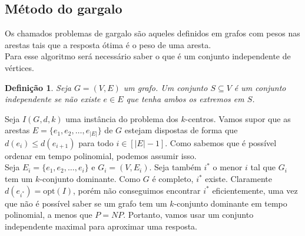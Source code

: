 \documentclass[12pt]{article}
\newcommand{\opt}{\ensuremath{\mathrm{opt}}}
\newtheorem{definition}[theorem]{Definição}
\newcommand{\NP}{\mathit{NP}}
\begin{document}
\subsection{Método do gargalo}
Os chamados problemas de gargalo são aqueles definidos em grafos com pesos nas arestas tais que a resposta ótima é o peso de uma aresta. \\
Para esse algoritmo será necessário saber o que é um conjunto independente de vértices.
\begin{definition}
    Seja $G = (V,E)$ um grafo. Um conjunto $S \subseteq V$ é um conjunto \emph{independente} se não existe $e \in E$ que tenha ambos os extremos em $S$.
\end{definition}
Seja $I(G,d,k)$ uma instância do problema dos $k$-centros. Vamos supor que as arestas $E = \{e_1,e_2,\ldots,e_{|E|}\}$ de $G$ estejam dispostas de forma que $d(e_i) \leq d(e_{i+1})$ para todo $i \in [|E|-1]$. Como sabemos que é possível ordenar em tempo polinomial, podemos assumir isso. \\
Seja $E_i = \{e_1,e_2,\ldots,e_i\}$ e $G_i = (V,E_i)$. Seja também $i^*$ o menor $i$ tal que $G_i$ tem um $k$-conjunto dominante. Como $G$ é completo, $i^*$ existe. Claramente $d(e_{i^*}) = \opt(I)$, porém não conseguimos encontrar $i^*$ eficientemente, uma vez que não é possível saber se um grafo tem um $k$-conjunto dominante em tempo polinomial, a menos que $P = \NP$. Portanto, vamos usar um conjunto independente maximal para aproximar uma resposta.
\end{document}
